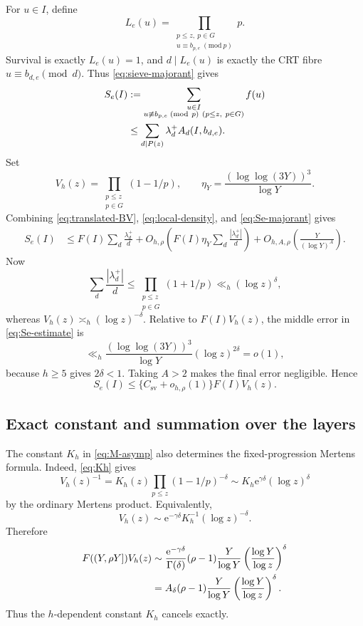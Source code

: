 \documentclass[10pt]{amsart}
\numberwithin{equation}{section}
\newcommand{\e}{\mathrm e}
\theoremstyle{remark}
\begin{document}
For \(u\in I\), define
\[
 L_e(u)=
 \prod_{\substack{p\le z,\ p\in G\\u\equiv b_{p,e}\;(\mathrm{mod}\ p)}}p.
\]
Survival is exactly \(L_e(u)=1\), and \(d\mid L_e(u)\) is exactly the CRT
fibre \(u\equiv b_{d,e}\pmod d\). Thus \eqref{eq:sieve-majorant} gives
\begin{align}
 S_e(I)
 &:=
 \sum_{\substack{u\in I\\
 u\not\equiv b_{p,e}\;(\mathrm{mod}\ p)\ (p\le z,\ p\in G)}}f(u)
 \notag\\
 &\le
 \sum_{d\mid P(z)}\lambda_d^+A_d(I,b_{d,e}).
\label{eq:Se-majorant}
\end{align}
Set
\[
 V_h(z)=\prod_{\substack{p\le z\\p\in G}}(1-1/p),
 \qquad
 \eta_Y=\frac{(\log\log(3Y))^3}{\log Y}.
\]
Combining \eqref{eq:translated-BV}, \eqref{eq:local-density}, and
\eqref{eq:Se-majorant} gives
\begin{align}
 S_e(I)
 &\le
 F(I)\sum_d\frac{\lambda_d^+}{d}
 +O_{h,\rho}\left(F(I)\eta_Y\sum_d\frac{|\lambda_d^+|}{d}\right)
 +O_{h,A,\rho}\left(\frac Y{(\log Y)^A}\right).
\label{eq:Se-estimate}
\end{align}
Now
\[
 \sum_d\frac{|\lambda_d^+|}{d}
 \le
 \prod_{\substack{p\le z\\p\in G}}(1+1/p)
 \ll_h(\log z)^\delta,
\]
whereas \(V_h(z)\asymp_h(\log z)^{-\delta}\). Relative to
\(F(I)V_h(z)\), the middle error in \eqref{eq:Se-estimate} is
\[
 \ll_h
 \frac{(\log\log(3Y))^3}{\log Y}(\log z)^{2\delta}
 =o(1),
\]
because \(h\ge5\) gives \(2\delta<1\). Taking \(A>2\) makes the final error
negligible. Hence
\begin{equation}\label{eq:Se-final}
 S_e(I)\le\{C_{\mathrm{sv}}+o_{h,\rho}(1)\}F(I)V_h(z).
\end{equation}

\subsection{Exact constant and summation over the layers}

The constant \(K_h\) in \eqref{eq:M-asymp} also determines the
fixed-progression Mertens formula. Indeed, \eqref{eq:Kh} gives
\[
 V_h(z)^{-1}
 =
 K_h(z)\prod_{p\le z}(1-1/p)^{-\delta}
 \sim K_h\e^{\gamma\delta}(\log z)^\delta
\]
by the ordinary Mertens product. Equivalently,
\begin{equation}\label{eq:Vh}
 V_h(z)\sim\e^{-\gamma\delta}K_h^{-1}(\log z)^{-\delta}.
\end{equation}
Therefore
\begin{align}
 F((Y,\rho Y])V_h(z)
 &\sim
 \frac{\e^{-\gamma\delta}}{\Gamma(\delta)}
 (\rho-1)\frac Y{\log Y}
 \left(\frac{\log Y}{\log z}\right)^\delta
 \notag\\
 &=
 A_\delta(\rho-1)\frac Y{\log Y}
 \left(\frac{\log Y}{\log z}\right)^\delta.
\label{eq:constant-cancel}
\end{align}
Thus the \(h\)-dependent constant \(K_h\) cancels exactly.
\end{document}
